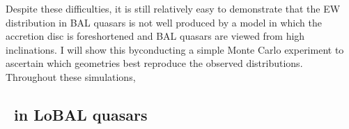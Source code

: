 Despite these difficulties, it is still relatively easy to 
demonstrate that the EW distribution in BAL quasars is not well produced by a 
model in which the accretion disc is foreshortened 
and BAL quasars are viewed from high inclinations. I will show this byconducting
a simple Monte Carlo experiment to ascertain which geometries best reproduce the observed
distributions. Throughout these simulations, 

\subsection{\ewo\ in LoBAL quasars}





